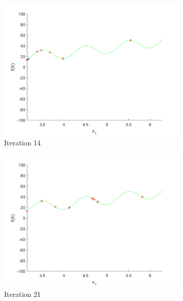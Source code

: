 \begin{figure}
\begin{subfigure}[b]{0.4\textwidth}
   \label{fig:s3-iter-1}
 \end{subfigure}
 \begin{subfigure}[b]{0.4\textwidth}
   \includegraphics[width=\textwidth]{img/smpl/rast1dshft/loa-iter-14}
   \caption{Iteration 14}
   \label{fig:s3-iter-2}
 \end{subfigure}
 \begin{subfigure}[b]{0.4\textwidth}
   \includegraphics[width=\textwidth]{img/smpl/rast1dshft/loa-iter-21}
   \caption{Iteration 21}
   \label{fig:s3-iter-3}
 \end{subfigure}
 \begin{subfigure}[b]{0.4\textwidth}

\end{subfigure}
\end{figure}
